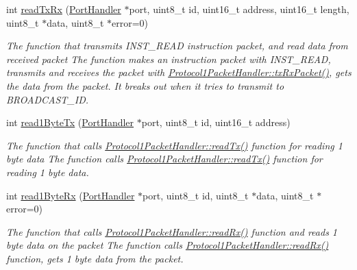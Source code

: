 \begin{DoxyCompactItemize}
int \hyperlink{classmercury_1_1_protocol1_packet_handler_af7212497f4f00a05122cb6ac9702acec}{read\+Tx\+Rx} (\hyperlink{classmercury_1_1_port_handler}{Port\+Handler} $\ast$port, uint8\+\_\+t id, uint16\+\_\+t address, uint16\+\_\+t length, uint8\+\_\+t $\ast$data, uint8\+\_\+t $\ast$error=0)
\begin{DoxyCompactList}\small\item\em The function that transmits I\+N\+S\+T\+\_\+\+R\+E\+AD instruction packet, and read data from received packet  The function makes an instruction packet with I\+N\+S\+T\+\_\+\+R\+E\+AD,  transmits and receives the packet with \hyperlink{classmercury_1_1_protocol1_packet_handler_ae488c4554064d6dd0ccabb9d2410e8f0}{Protocol1\+Packet\+Handler\+::tx\+Rx\+Packet()},  gets the data from the packet.  It breaks out  when it tries to transmit to B\+R\+O\+A\+D\+C\+A\+S\+T\+\_\+\+ID. \end{DoxyCompactList}\item 
int \hyperlink{classmercury_1_1_protocol1_packet_handler_afe2fdc444ab1dbd7d0eb2d16a9105e1d}{read1\+Byte\+Tx} (\hyperlink{classmercury_1_1_port_handler}{Port\+Handler} $\ast$port, uint8\+\_\+t id, uint16\+\_\+t address)
\begin{DoxyCompactList}\small\item\em The function that calls \hyperlink{classmercury_1_1_protocol1_packet_handler_a06f83e8acee5de4f733cc26a865602c3}{Protocol1\+Packet\+Handler\+::read\+Tx()} function for reading 1 byte data  The function calls \hyperlink{classmercury_1_1_protocol1_packet_handler_a06f83e8acee5de4f733cc26a865602c3}{Protocol1\+Packet\+Handler\+::read\+Tx()} function for reading 1 byte data. \end{DoxyCompactList}\item 
int \hyperlink{classmercury_1_1_protocol1_packet_handler_a6392609cdaac2cddb317706e8ef972c4}{read1\+Byte\+Rx} (\hyperlink{classmercury_1_1_port_handler}{Port\+Handler} $\ast$port, uint8\+\_\+t id, uint8\+\_\+t $\ast$data, uint8\+\_\+t $\ast$error=0)
\begin{DoxyCompactList}\small\item\em The function that calls \hyperlink{classmercury_1_1_protocol1_packet_handler_a341885c5f9539e30f03946ea17884d02}{Protocol1\+Packet\+Handler\+::read\+Rx()} function and reads 1 byte data on the packet  The function calls \hyperlink{classmercury_1_1_protocol1_packet_handler_a341885c5f9539e30f03946ea17884d02}{Protocol1\+Packet\+Handler\+::read\+Rx()} function,  gets 1 byte data from the packet. \end{DoxyCompactList}\item 

\end{DoxyCompactItemize}
